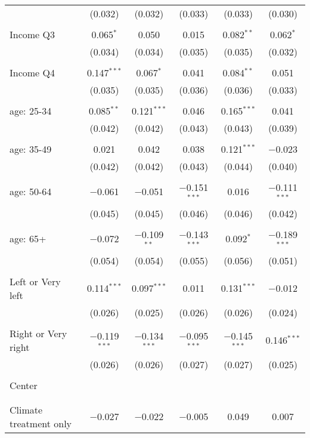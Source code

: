 \begin{tabular}{@{\extracolsep{5pt}}lccccc}
  & (0.032) & (0.032) & (0.033) & (0.033) & (0.030) \\ 
  & & & & & \\ 
 Income Q3 & 0.065$^{*}$ & 0.050 & 0.015 & 0.082$^{**}$ & 0.062$^{*}$ \\ 
  & (0.034) & (0.034) & (0.035) & (0.035) & (0.032) \\ 
  & & & & & \\ 
 Income Q4 & 0.147$^{***}$ & 0.067$^{*}$ & 0.041 & 0.084$^{**}$ & 0.051 \\ 
  & (0.035) & (0.035) & (0.036) & (0.036) & (0.033) \\ 
  & & & & & \\ 
 age: 25-34 & 0.085$^{**}$ & 0.121$^{***}$ & 0.046 & 0.165$^{***}$ & 0.041 \\ 
  & (0.042) & (0.042) & (0.043) & (0.043) & (0.039) \\ 
  & & & & & \\ 
 age: 35-49 & 0.021 & 0.042 & 0.038 & 0.121$^{***}$ & $-$0.023 \\ 
  & (0.042) & (0.042) & (0.043) & (0.044) & (0.040) \\ 
  & & & & & \\ 
 age: 50-64 & $-$0.061 & $-$0.051 & $-$0.151$^{***}$ & 0.016 & $-$0.111$^{***}$ \\ 
  & (0.045) & (0.045) & (0.046) & (0.046) & (0.042) \\ 
  & & & & & \\ 
 age: 65+ & $-$0.072 & $-$0.109$^{**}$ & $-$0.143$^{***}$ & 0.092$^{*}$ & $-$0.189$^{***}$ \\ 
  & (0.054) & (0.054) & (0.055) & (0.056) & (0.051) \\ 
  & & & & & \\ 
 Left or Very left & 0.114$^{***}$ & 0.097$^{***}$ & 0.011 & 0.131$^{***}$ & $-$0.012 \\ 
  & (0.026) & (0.025) & (0.026) & (0.026) & (0.024) \\ 
  & & & & & \\ 
 Right or Very right & $-$0.119$^{***}$ & $-$0.134$^{***}$ & $-$0.095$^{***}$ & $-$0.145$^{***}$ & 0.146$^{***}$ \\ 
  & (0.026) & (0.026) & (0.027) & (0.027) & (0.025) \\ 
  & & & & & \\ 
 Center &  &  &  &  &  \\ 
  &  &  &  &  &  \\ 
  & & & & & \\ 
 Climate treatment only & $-$0.027 & $-$0.022 & $-$0.005 & 0.049 & 0.007 \\ 

\end{tabular}

